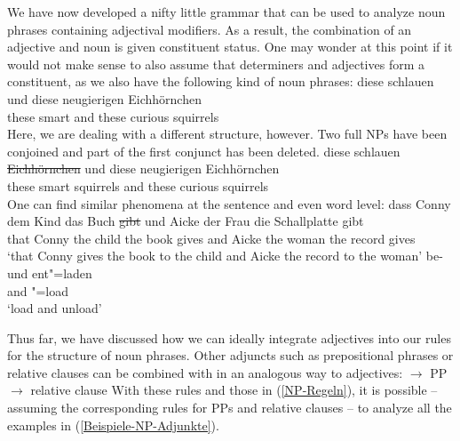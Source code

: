 We have now developed a nifty little grammar that can be used to analyze noun phrases containing
adjectival modifiers. As a result, the combination of an adjective and noun is given constituent
status. One may wonder at this point if it would not make sense to also assume that determiners and
adjectives form a constituent, as we also have the following kind of noun phrases: 
\ea
\gll diese schlauen und diese neugierigen Eichhörnchen\\
     these smart    and these curious     squirrels\\
\z
Here, we are dealing with a different structure, however. Two full NPs have been
conjoined and part of the first conjunct has been deleted.
\ea
\gll diese schlauen \st{Eichhörnchen} und diese neugierigen Eichhörnchen\\
     these smart    squirrels         and these curious     squirrels\\
\z
One can find similar phenomena at the sentence and even word level:
\eal
\ex 
\gll dass Conny dem Kind  das Buch \st{gibt} und Aicke der Frau die Schallplatte gibt\\
     that Conny the child the book gives     and Aicke the woman the record gives\\
\glt `that Conny gives the book to the child and Aicke the record to the woman'
\ex 
\gll be- und ent"=laden\\
     \prfx{} and \prfx{}"=load\\
\glt `load and unload'
\zl

\noindent
Thus far, we have discussed how we can ideally integrate adjectives into our rules for the structure of noun phrases.
Other adjuncts such as prepositional phrases or relative clauses can be combined with \nbar in an analogous way to adjectives:
\eal
\ex\label{xbar-PP-Adjunkt-an-N} \nbar $\to$ \nbar PP
\ex \nbar $\to$ \nbar relative clause
\zl
With these rules and those in (\ref{NP-Regeln}), it is possible -- assuming the corresponding rules for PPs and
relative clauses -- to analyze all the examples in (\ref{Beispiele-NP-Adjunkte}).

